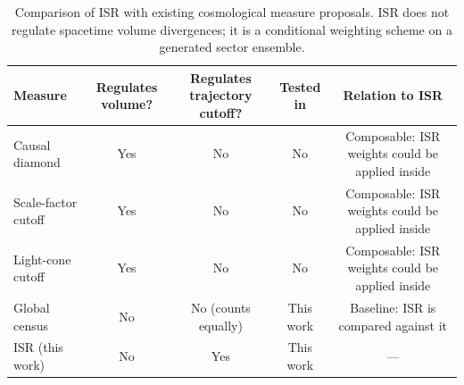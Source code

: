 \begin{table}[t]
  \centering
  \caption{Comparison of ISR with existing cosmological measure proposals. ISR does not regulate spacetime volume divergences; it is a conditional weighting scheme on a generated sector ensemble.}
  \label{tab:measure_comparison}
  \small
  \begin{tabular}{lcccc}
    \toprule
    Measure & Regulates volume? & Regulates trajectory cutoff? & Tested in & Relation to ISR \\
    \midrule
    Causal diamond \cite{winitzki_measure} & Yes & No & No & Composable: ISR weights could be applied inside \\
    Scale-factor cutoff \cite{winitzki_measure} & Yes & No & No & Composable: ISR weights could be applied inside \\
    Light-cone cutoff \cite{garriga_vilenkin} & Yes & No & No & Composable: ISR weights could be applied inside \\
    Global census & No & No (counts equally) & This work & Baseline: ISR is compared against it \\
    ISR (this work) & No & Yes & This work & --- \\
    \bottomrule
  \end{tabular}
\end{table}
